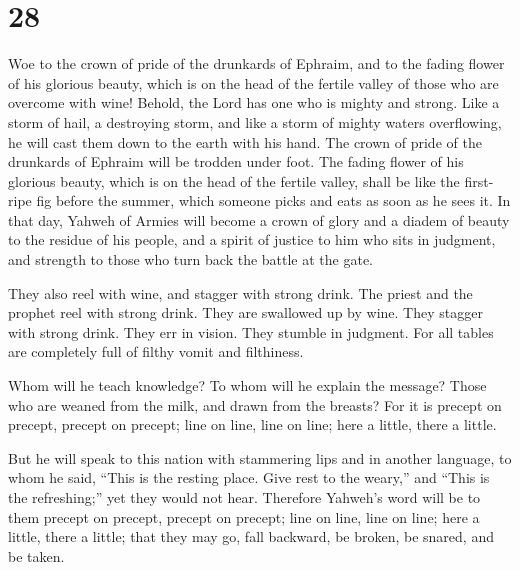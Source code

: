 \hypertarget{section-27}{%
\section{28}\label{section-27}}

 Woe to the crown of pride of the drunkards of Ephraim,
and to the fading flower of his glorious beauty, which is on the head of
the fertile valley of those who are overcome with wine! 
Behold, the Lord has one who is mighty and strong. Like a storm of hail,
a destroying storm, and like a storm of mighty waters overflowing, he
will cast them down to the earth with his hand.  The crown
of pride of the drunkards of Ephraim will be trodden under foot.
 The fading flower of his glorious beauty, which is on the
head of the fertile valley, shall be like the first-ripe fig before the
summer, which someone picks and eats as soon as he sees it.
 In that day, Yahweh of Armies will become a crown of
glory and a diadem of beauty to the residue of his people,
 and a spirit of justice to him who sits in judgment, and
strength to those who turn back the battle at the gate.

 They also reel with wine, and stagger with strong drink.
The priest and the prophet reel with strong drink. They are swallowed up
by wine. They stagger with strong drink. They err in vision. They
stumble in judgment.  For all tables are completely full
of filthy vomit and filthiness.

 Whom will he teach knowledge? To whom will he explain the
message? Those who are weaned from the milk, and drawn from the breasts?
 For it is precept on precept, precept on precept; line
on line, line on line; here a little, there a little.

 But he will speak to this nation with stammering lips
and in another language,  to whom he said, ``This is the
resting place. Give rest to the weary,'' and ``This is the refreshing;''
yet they would not hear.  Therefore Yahweh's word will be
to them precept on precept, precept on precept; line on line, line on
line; here a little, there a little; that they may go, fall backward, be
broken, be snared, and be taken.

